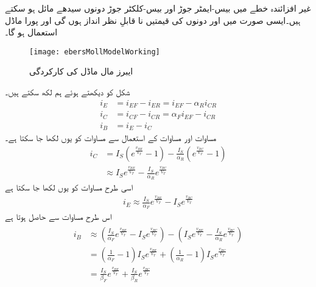 	غیر افزائندہ خطے میں بیس-ایمٹر  جوڑ اور بیس-کلکٹر جوڑ دونوں سیدھے مائل ہو سکتے ہیں۔ایسی صورت میں  اور  دونوں کی قیمتیں نا قابلِ نظر انداز ہوں گی اور پورا ماڈل استعمال ہو گا۔
\begin{figure}
\centering
\texttt{[image: ebersMollModelWorking]}
\caption{ ایبرز مال ماڈل کی کارکردگی}
\label{شکل_ایبر_مال_کی_کارکردگی}
\end{figure}
شکل   کو دیکھتے  ہوئے ہم لکھ سکتے ہیں۔
\begin{align}
i_E&=i_{EF}-i_{ER}=i_{EF}-\alpha_R i_{CR} \label{مساوات_ٹرانزسٹر_مکمل_ایبر_مال_مخارج_رو}  \\
i_C&=i_{CF}-i_{CR}=\alpha_F i_{EF}-i_{CR} \label{مساوات_ٹرانزسٹر_مکمل_ایبر_مال_کلکٹر _رو} \\
i_B&=i_E-i_C \label{مساوات_ٹرانزسٹر_مکمل_ایبر_مال_قابو_رو_الف}
\end{align}
مساوات   اور مساوات   کے استعمال سے مساوات   کو یوں لکھا جا سکتا ہے۔
\begin{align} \label{مساوات_ٹرانزسٹر_مکمل_ایبر_مال_کلکٹر _رو_بہتر}
i_C&=I_S \left (e^{\frac{v_{BE}}{V_T}}-1 \right )-\frac{I_S}{\alpha_R} \left (e^{\frac{v_{BC}}{V_T}}-1 \right )\\
&\approx I_S e^{\frac{v_{BE}}{V_T}}-\frac{I_S}{\alpha_R} e^{\frac{v_{BC}}{V_T}}
\end{align}
اسی طرح مساوات   کو یوں لکھا جا سکتا ہے
\begin{align} \label{مساوات_ٹرانزسٹر_مکمل_ایبر_مال_مخارج_رو_بہتر}
i_E \approx \frac{I_S}{\alpha_F} e^{\frac{v_{BE}}{V_T}}-I_S e^{\frac{v_{BC}}{V_T}}
\end{align}
اس طرح مساوات   سے حاصل ہوتا ہے
\begin{gather} \label{مساوات_ٹرانزسٹر_مکمل_ایبر_مال_قابو_رو_بہتر}
\begin{aligned}
i_B &\approx  \left (\frac{I_S}{\alpha_F} e^{\frac{v_{BE}}{V_T}}-I_S e^{\frac{v_{BC}}{V_T}} \right )- \left (I_S e^{\frac{v_{BE}}{V_T}}-\frac{I_S}{\alpha_R} e^{\frac{v_{BC}}{V_T}} \right )\\
&=\left (\frac{1}{\alpha_F}-1 \right ) I_S e^{\frac{v_{BE}}{V_T}}+\left (\frac{1}{\alpha_R}-1 \right ) I_S e^{\frac{v_{BC}}{V_T}}\\
&=\frac{I_S}{\beta_F} e^{\frac{v_{BE}}{V_T}}+\frac{I_S}{\beta_R} e^{\frac{v_{BC}}{V_T}}
\end{aligned}
\end{gather}
